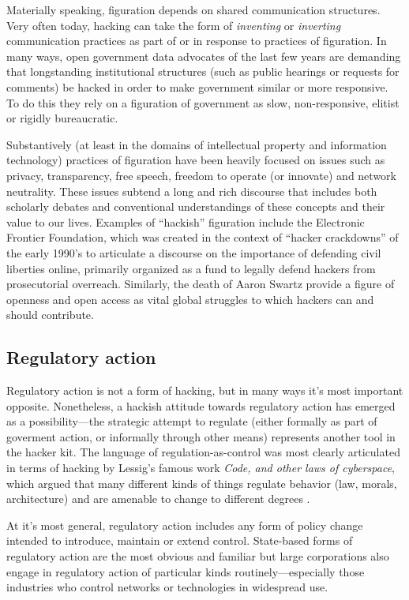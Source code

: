 \documentclass[10pt,letter,oneside]{scrartcl}
\begin{document}
Materially speaking, figuration depends on shared communication structures. Very
often today, hacking can take the form of \emph{inventing} or \emph{inverting}
communication practices as part of or in response to practices of figuration.
In many ways, open government data advocates of the last few years are demanding
that longstanding institutional structures (such as public hearings or requests
for comments) be hacked in order to make government similar or more responsive.
To do this they rely on a figuration of government as slow, non-responsive,
elitist or rigidly bureaucratic.

Substantively (at least in the domains of intellectual property and information
technology) practices of figuration have been heavily focused on issues such as
privacy, transparency, free speech, freedom to operate (or innovate) and network
neutrality.  These issues subtend a long and rich discourse that includes both
scholarly debates and conventional understandings of these concepts and their
value to our lives.  Examples of ``hackish'' figuration include the Electronic
Frontier Foundation, which was created in the context of ``hacker crackdowns''
of the early 1990's to articulate a discourse on the importance of defending
civil liberties online, primarily organized as a fund to legally defend hackers
from prosecutorial overreach.  Similarly, the death of Aaron Swartz provide a
figure of openness and open access as vital global struggles to which hackers
can and should contribute.

\subsection*{Regulatory action}

Regulatory action is not a form of hacking, but in many ways it's most important
opposite.  Nonetheless, a hackish attitude towards regulatory action has emerged
as a possibility---the strategic attempt to regulate (either formally as part of
goverment action, or informally through other means) represents another tool in
the hacker kit.  The language of regulation-as-control was most clearly
articulated in terms of hacking by Lessig's famous work \emph{Code, and other
  laws of cyberspace},
which argued that many different kinds of things regulate behavior (law, morals,
architecture) and are amenable to change to different degrees \cite{lessig2000code}.

At it's most general, regulatory action includes any form of policy change
intended to introduce, maintain or extend control.  State-based forms of
regulatory action are the most obvious and familiar but large corporations also
engage in regulatory action of particular kinds routinely---especially those
industries who control networks or technologies in widespread use.
\end{document}
